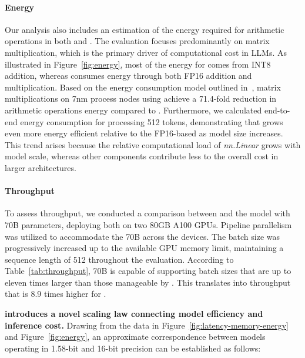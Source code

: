 \paragraph{Energy}

Our analysis also includes an estimation of the energy required for arithmetic operations in both  and . The evaluation focuses predominantly on matrix multiplication, which is the primary driver of computational cost in LLMs. As illustrated in Figure~\ref{fig:energy}, most of the energy for  comes from INT8 addition, whereas  consumes energy through both FP16 addition and multiplication. Based on the energy consumption model outlined in~\cite{energycost, pokebnn}, matrix multiplications on 7nm process nodes using  achieve a 71.4-fold reduction in arithmetic operations energy compared to . Furthermore, we calculated end-to-end energy consumption for processing 512 tokens, demonstrating that  grows even more energy efficient relative to the FP16-based  as model size increases. This trend arises because the relative computational load of \emph{nn.Linear} grows with model scale, whereas other components contribute less to the overall cost in larger architectures.

\paragraph{Throughput}

To assess throughput, we conducted a comparison between  and the  model with 70B parameters, deploying both on two 80GB A100 GPUs. Pipeline parallelism~\cite{gpipe} was utilized to accommodate the 70B  across the devices. The batch size was progressively increased up to the available GPU memory limit, maintaining a sequence length of 512 throughout the evaluation. According to Table~\ref{tab:throughput},  70B is capable of supporting batch sizes that are up to eleven times larger than those manageable by . This translates into throughput that is 8.9 times higher for .

\textbf{ introduces a novel scaling law connecting model efficiency and inference cost.} Drawing from the data in Figure~\ref{fig:latency-memory-energy} and Figure~\ref{fig:energy}, an approximate correspondence between models operating in 1.58-bit and 16-bit precision can be established as follows:

